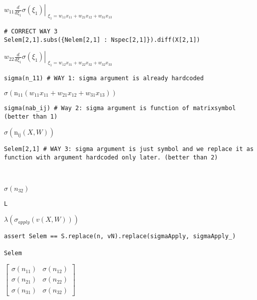 \documentclass[
]{article}
\begin{document}
\(\displaystyle w_{11} \left. \frac{d}{d \xi_{1}} \sigma{\left(\xi_{1} \right)} \right|_{\substack{ \xi_{1}=w_{11} x_{11} + w_{21} x_{12} + w_{31} x_{13} }}\)

\begin{verbatim}
# CORRECT WAY 3
Selem[2,1].subs({Nelem[2,1] : Nspec[2,1]}).diff(X[2,1])
\end{verbatim}

\(\displaystyle w_{22} \left. \frac{d}{d \xi_{1}} \sigma{\left(\xi_{1} \right)} \right|_{\substack{ \xi_{1}=w_{12} x_{31} + w_{22} x_{32} + w_{32} x_{33} }}\)

\begin{verbatim}
sigma(n_11) # WAY 1: sigma argument is already hardcoded
\end{verbatim}

\(\displaystyle \sigma{\left(\operatorname{n_{11}}{\left(w_{11} x_{11} + w_{21} x_{12} + w_{31} x_{13} \right)} \right)}\)

\begin{verbatim}
sigma(nab_ij) # Way 2: sigma argument is function of matrixsymbol (better than 1)
\end{verbatim}

\(\displaystyle \sigma{\left(\operatorname{n_{ij}}{\left(X,W \right)} \right)}\)

\begin{verbatim}
Selem[2,1] # WAY 3: sigma argument is just symbol and we replace it as function with argument hardcoded only later. (better than 2)



\end{verbatim}

\(\displaystyle \sigma{\left(n_{32} \right)}\)

\begin{verbatim}
L
\end{verbatim}

\(\displaystyle \lambda{\left(\sigma_{apply}{\left(v{\left(X,W \right)} \right)} \right)}\)

\begin{verbatim}
assert Selem == S.replace(n, vN).replace(sigmaApply, sigmaApply_)

Selem
\end{verbatim}

\(\displaystyle \left[\begin{matrix}\sigma{\left(n_{11} \right)} & \sigma{\left(n_{12} \right)}\\\sigma{\left(n_{21} \right)} & \sigma{\left(n_{22} \right)}\\\sigma{\left(n_{31} \right)} & \sigma{\left(n_{32} \right)}\end{matrix}\right]\)
\end{document}
